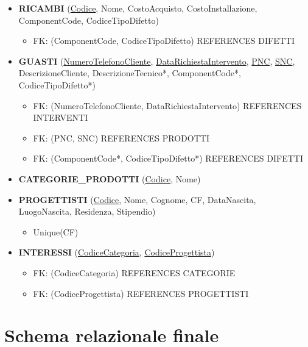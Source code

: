 \documentclass[a4paper, 12pt]{report}
\begin{document}
\begin{itemize}
	\item \textbf{RICAMBI} (\underline{Codice}, Nome, CostoAcquisto, CostoInstallazione, ComponentCode, CodiceTipoDifetto)
		\begin{itemize}[leftmargin=*, topsep=0pt]
			\item[] FK: (ComponentCode, CodiceTipoDifetto) REFERENCES DIFETTI
		\end{itemize}		
	\item \textbf{GUASTI} (\underline{NumeroTelefonoCliente}, \underline{DataRichiestaIntervento}, \underline{PNC}, \underline{SNC}, DescrizioneCliente, DescrizioneTecnico*, ComponentCode*,
	CodiceTipoDifetto*)
		\begin{itemize}[leftmargin=*, topsep=0pt]
			\item[] FK: (NumeroTelefonoCliente, DataRichiestaIntervento) REFERENCES INTERVENTI
			\item[] FK: (PNC, SNC) REFERENCES PRODOTTI
			\item[] FK: (ComponentCode*, CodiceTipoDifetto*) REFERENCES DIFETTI
		\end{itemize}		
	\item \textbf{CATEGORIE\_PRODOTTI} (\underline{Codice}, Nome)
	\item \textbf{PROGETTISTI} (\underline{Codice}, Nome, Cognome, CF, DataNascita, LuogoNascita, Residenza, Stipendio)
		\begin{itemize}[leftmargin=*, topsep=0pt]
			\item[] Unique(CF)
		\end{itemize}
	\item \textbf{INTERESSI} (\underline{CodiceCategoria}, \underline{CodiceProgettista})
		\begin{itemize}[leftmargin=*, topsep=0pt]
			\item[] FK: (CodiceCategoria) REFERENCES CATEGORIE
			\item[] FK: (CodiceProgettista) REFERENCES PROGETTISTI
		\end{itemize}
\end{itemize}

\section{Schema relazionale finale}
\end{document}
